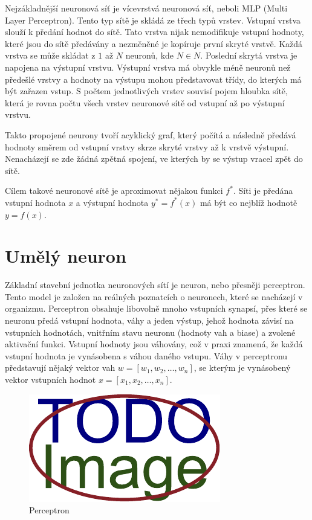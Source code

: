 Nejzákladnější neuronová síť je vícevrstvá neuronová síť, neboli MLP (Multi Layer Perceptron). Tento typ sítě je skládá ze třech typů vrstev. Vstupní vrstva slouží k předání hodnot do sítě. Tato vrstva nijak nemodifikuje vstupní hodnoty, které jsou do sítě předávány a nezměněné je kopíruje první skryté vrstvě. Každá vrstva se může skládat z $1$ až $N$ neuronů, kde $N \in N$. Poslední skrytá vrstva je napojena na výstupní vrstvu. Výstupní vrstva má obvykle méně neuronů než předešlé vrstvy a hodnoty na výstupu mohou představovat třídy, do kterých má být zařazen vstup. S počtem jednotlivých vrstev souvisí pojem hloubka sítě, která je rovna počtu všech vrstev neuronové sítě od vstupní až po výstupní vrstvu.

Takto propojené neurony tvoří acyklický graf, který počítá a následně předává hodnoty směrem od vstupní vrstvy skrze skryté vrstvy až k vrstvě výstupní. Nenacházejí se zde žádná zpětná spojení, ve kterých by se výstup vracel zpět do sítě.\cite{mitdeeplearning}

Cílem takové neuronové sítě je aproximovat nějakou funkci $f^\ast$. Síti je předána vstupní hodnota $x$ a výstupní hodnota $y^\ast = f^\ast(x)$ má být co nejblíž hodnotě $y = f(x)$.


\section{Umělý neuron}
Základní stavební jednotka neuronových sítí je neuron, nebo přesněji perceptron. Tento model je založen na reálných poznatcích o neuronech, které se nacházejí v organizmu. Perceptron obsahuje libovolně mnoho vstupních synapsí, přes které se neuronu předá vstupní hodnota, váhy a jeden výstup, jehož hodnota závisí na vstupních hodnotách, vnitřním stavu neuronu (hodnoty vah a biase) a zvolené aktivační funkci. Vstupní hodnoty jsou váhovány, což v praxi znamená, že každá vstupní hodnota je vynásobena s váhou daného vstupu. Váhy v perceptronu představují nějaký vektor vah $w = [w_1, w_2, \dots, w_n]$, se kterým je vynásobený vektor vstupních hodnot $x = [x_1, x_2, \dots, x_n]$.

\begin{figure}[H]
    \centering
    \includegraphics[scale=1]{obrazky-figures/placeholder.pdf}
    \caption{\label{fig:neuron}Perceptron}
\end{figure}

